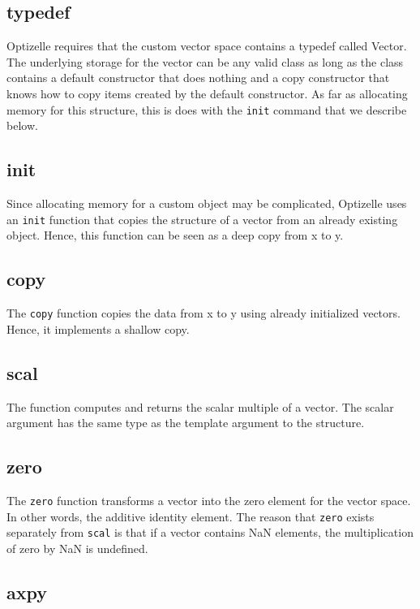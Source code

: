 \documentclass{report}
\begin{document}
\subsection{typedef}

       Optizelle requires that the custom vector space contains a typedef called Vector.  The underlying storage for the vector can be any valid class as long as the class contains a default constructor that does nothing and a copy constructor that knows how to copy items created by the default constructor.  As far as allocating memory for this structure, this is does with the \texttt{init} command that we describe below.

\subsection{init}

        Since allocating memory for a custom object may be complicated, Optizelle uses an \texttt{init} function that copies the structure of a vector from an already existing object.  Hence, this function can be seen as a deep copy from x to y.

\subsection{copy}
        
        The \texttt{copy} function copies the data from x to y using already initialized vectors.  Hence, it implements a shallow copy.

\subsection{scal}

        The  function computes and returns the scalar multiple of a vector.  The scalar argument has the same type as the template argument to the structure.

\subsection{zero}

        The \texttt{zero} function transforms a vector into the zero element for the vector space.  In other words, the additive identity element.  The reason that \texttt{zero} exists separately from \texttt{scal} is that if a vector contains NaN elements, the multiplication of zero by NaN is undefined.

\subsection{axpy}
\end{document}
